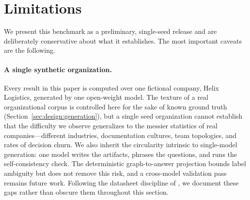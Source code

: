 
\section{Limitations}
\label{sec:limitations}

We present this benchmark as a preliminary, single-seed release and are
deliberately conservative about what it establishes. The most important caveats
are the following.

\paragraph{A single synthetic organization.}
\label{para:single-synthetic-org}
Every result in this paper is computed over one fictional company, Helix
Logistics, generated by one open-weight model. The texture of a real
organizational corpus is controlled here for the sake of known ground truth
(Section~\ref{sec:design:generation}), but a single seed organization cannot
establish that the difficulty we observe generalizes to the messier statistics
of real companies---different industries, documentation cultures, team
topologies, and rates of decision churn. We also inherit the circularity
intrinsic to single-model generation: one model writes the artifacts, phrases
the questions, and runs the self-consistency check. The deterministic
graph-to-answer projection bounds label ambiguity but does not remove this risk,
and a cross-model validation pass remains future work. Following the datasheet
discipline of \citet{gebru2021datasheets}, we document these gaps rather than
obscure them throughout this section.

